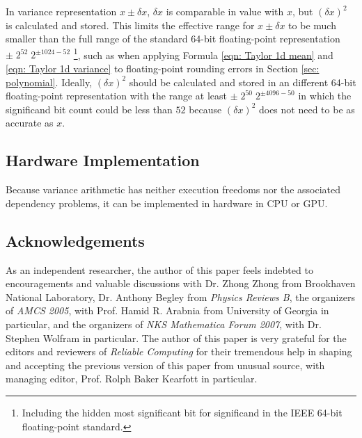 \documentclass[twoside]{article}
\numberwithin{equation}{section}
\begin{document}
In variance representation $x \pm \delta x$, $\delta x$ is comparable in value with $x$, but $(\delta x)^2$ is calculated and stored.
This limits the effective range for $x \pm \delta x$ to be much smaller than the full range of the standard 64-bit floating-point representation $\pm\; 2^{52} \; 2^{\pm 1024 - 52}$ \footnote{Including the hidden most significant bit for significand in the IEEE 64-bit floating-point standard.}, such as when applying Formula \eqref{eqn: Taylor 1d mean} and \eqref{eqn: Taylor 1d variance} to floating-point rounding errors in Section \ref{sec: polynomial}.
Ideally, $(\delta x)^2$ should be calculated and stored in an different 64-bit floating-point representation with the range at least $\pm\; 2^{50} \; 2^{\pm 4096 - 50}$ in which the significand bit count could be less than $52$ because $(\delta x)^2$ does not need to be as accurate as $x$.


\subsection{Hardware Implementation}

Because variance arithmetic has neither execution freedoms nor the associated dependency problems, it can be implemented in hardware in CPU or GPU.



\subsection{Acknowledgements}

As an independent researcher, the author of this paper feels indebted to encouragements and valuable discussions with Dr. Zhong Zhong from Brookhaven National Laboratory, Dr. Anthony Begley from \emph{Physics Reviews B}, the organizers of \emph{AMCS 2005}, with Prof. Hamid R. Arabnia from University of Georgia in particular, and the organizers of \emph{NKS Mathematica Forum 2007}, with Dr. Stephen Wolfram in particular. 
The author of this paper is very grateful for the editors and reviewers of \emph{Reliable Computing} for their tremendous help in shaping and accepting the previous version of this paper from unusual source, with managing editor, Prof. Rolph Baker Kearfott in particular.





\end{document}
